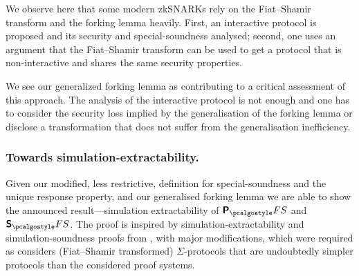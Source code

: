 \let\accentvec\vec \documentclass[runningheads,10pt]{llncs}
\begin{document}
We observe here that some modern zkSNARKs rely on the Fiat--Shamir transform
and the forking lemma heavily. First, an interactive protocol is proposed and
its security and special-soundness analysed; second, one uses an argument that
the Fiat--Shamir transform can be used to get a protocol that is
non-interactive and shares the same security properties.

We see our generalized forking lemma as contributing to a critical assessment of
this approach. The analysis of the interactive protocol is not enough and one
has to consider the security loss implied by the generalisation of the forking
lemma or disclose a transformation that does not suffer from the generalisation
inefficiency.

\subsubsection{Towards simulation-extractability.} Given our modified, less
restrictive, definition for special-soundness and the unique response property, and
our generalised forking lemma we are able to show the announced result---simulation
extractability of $\plonkprotfs$ and $\sonicprotfs$. The proof is inspired by
simulation-extractability and simulation-soundness proofs from
\cite{INDOCRYPT:FKMV12}, with major modifications, which were required as
\cite{INDOCRYPT:FKMV12} considers (Fiat--Shamir transformed) $\Sigma$-protocols
that are undoubtedly simpler protocols than the considered proof systems.

\end{document}
